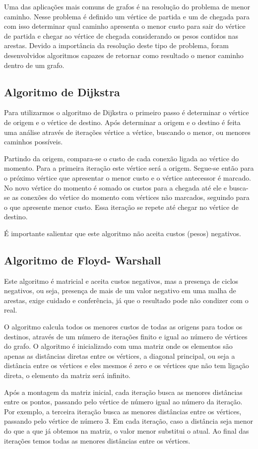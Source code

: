 Uma das aplicações mais comuns de grafos é na  resolução do problema de menor caminho. Nesse problema é definido  um vértice de partida e um de chegada para com isso determinar qual caminho apresenta o menor custo para sair do vértice de partida e chegar ao vértice de chegada considerando os pesos contidos nas arestas. Devido a importância da resolução deste tipo de problema, foram desenvolvidos algoritmos capazes de retornar como resultado o menor caminho dentro de um grafo.

\subsection{Algoritmo de Dijkstra}

Para utilizarmos o algoritmo de Dijkstra o primeiro passo é determinar o vértice de origem e o vértice de destino. Após determinar  a origem e o destino é feita uma análise através de iterações vértice a vértice, buscando o menor, ou menores caminhos possíveis.

Partindo da origem, compara-se o custo de cada conexão ligada ao vértice do momento. Para a primeira iteração este vértice será a origem. Segue-se então para o próximo vértice que apresentar o menor custo e o vértice antecessor é marcado. No novo vértice do momento é somado os custos para a chegada até ele e busca-se as conexões do vértice do momento com vértices não marcados, seguindo para o que apresente menor custo. Essa iteração se repete até chegar no vértice de destino.

É importante salientar que este algoritmo não aceita custos (pesos) negativos.


\subsection{Algoritmo de Floyd- Warshall}

Este algoritmo é matricial e aceita custos negativos, mas a presença de ciclos negativos, ou seja, presença de mais de um valor negativo em uma malha de arestas, exige cuidado e conferência, já que o resultado pode não condizer com o real.
	
O algoritmo calcula todos os menores custos de todas as origens para todos os destinos, através de um número de iterações finito e igual ao número de vértices do grafo. O algoritmo é inicializado com uma matriz onde os elementos são apenas as distâncias diretas entre os vértices, a diagonal principal, ou seja a distância entre os vértices e eles mesmos é zero e os vértices que não tem ligação direta, o elemento da matriz será infinito.

Após a montagem da matriz inicial, cada iteração busca as menores distâncias entre os pontos, passando pelo vértice de número igual ao número da iteração. Por exemplo, a terceira iteração busca as menores distâncias entre os vértices, passando pelo vértice de número 3. Em cada iteração, caso a distância seja menor do que a que já obtemos na matriz, o valor menor substitui o atual. Ao final das iterações temos todas as menores distâncias entre os vértices.
